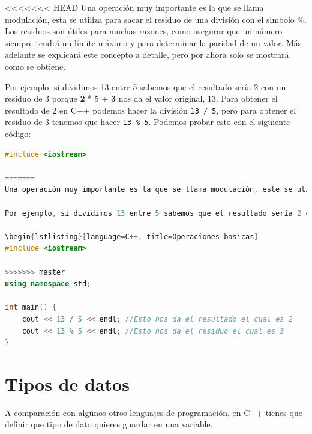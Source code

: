 \documentclass{article}
\begin{document}
<<<<<<< HEAD
Una operación muy importante es la que se llama modulación, esta se utiliza para sacar el residuo de una división con el simbolo \%. Los residuos son útiles para muchas razones, como asegurar que un número siempre tendrá un límite máximo y para determinar la paridad de un valor. Más adelante se explicará este concepto a detalle, pero por ahora solo se mostrará como se obtiene.

Por ejemplo, si dividimos 13 entre 5 sabemos que el resultado sería 2 con un residuo de 3 porque \textbf{2} * 5 + \textbf{3} nos da el valor original, 13. Para obtener el resultado de 2 en C++ podemos hacer la división \lstinline{13 / 5}, pero para obtener el residuo de 3 tenemos que hacer \lstinline{13 % 5}. Podemos probar esto con el siguiente código:

\begin{lstlisting}[language=C++, title=División y modulación]
#include <iostream>

=======
Una operación muy importante es la que se llama modulación, este se utiliza para sacar el residuo de una división con el simbolo \%. Los residuos son útiles para muchas razones, como asegurar que un número siempre tendrá un límite máximo y para determinar la paridad de un valor. Más adelante se explicará este concepto a detalle, pero por ahora solo se mostrará como se obtiene.

Por ejemplo, si dividimos 13 entre 5 sabemos que el resultado sería 2 con un residuo de 3 porque \textbf{2} * 5 + \textbf{3} nos da el valor original, 13. Para obtener el resultado de 2 en C++ podemos hacer la division \textbf{13 / 5}, pero para obtener el residuo de 3 tenemos que hacer \textbf{13 \% 5}. Podemos probar esto con el siguiente código:

\begin{lstlisting}[language=C++, title=Operaciones basicas]
#include <iostream>

>>>>>>> master
using namespace std;

int main() {
	cout << 13 / 5 << endl; //Esto nos da el resultado el cual es 2
	cout << 13 % 5 << endl; //Esto nos da el residuo el cual es 3
}
\end{lstlisting}

\section{Tipos de datos}

A comparación con algúnos otros lenguajes de programación, en C++ tienes que definir que tipo de dato quieres guardar en una variable.
\end{document}
